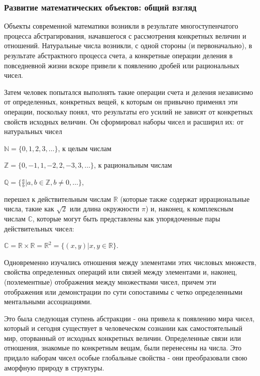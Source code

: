 \subsubsection{Развитие математических объектов: общий взгляд}
Объекты современной математики возникли в результате многоступенчатого процесса абстрагирования, начавшегося с рассмотрения конкретных величин и отношений. Натуральные числа возникли, с одной стороны (и первоначально), в результате абстрактного процесса счета, а конкретные операции деления в повседневной жизни вскоре привели к появлению дробей или рациональных чисел.

Затем человек попытался выполнять такие операции счета и деления независимо от определенных, конкретных вещей, к которым он привычно применял эти операции, поскольку понял, что результаты его усилий не зависят от конкретных свойств исходных величин.
Он сформировал наборы чисел и расширил их: от натуральных чисел

\vspace{0.5cm}
\(\mathbb{N}=\{0,1,2,3,\dots\}\), к целым числам

\(\mathbb{Z}=\{0,-1,1,-2,2,-3,3,\dots\}\), к рациональным числам

\(\mathbb{Q}=\{\frac{a}{b}|a,b \in \mathbb{Z}, b \neq 0 ,\dots\}\),

\vspace{0.5cm}

перешел к действительным числам \(\mathbb{R}\) (которые также содержат иррациональные числа, такие как \(\sqrt {2}\) или длина окружности \(\pi\)) и, наконец, к комплексным числам \(\mathbb{C}\), которые могут быть представлены как упорядоченные пары действительных чисел:

\vspace{0.5cm}
\(\mathbb{C}=\mathbb{R} \times \mathbb{R} = \mathbb{R}^{2} = \{(x,y) | x,y \in \mathbb{R}\}\).

\vspace{0.5cm}

Одновременно изучались отношения между элементами этих числовых множеств, свойства определенных операций или связей между элементами и, наконец, (поэлементные) отображения между множествами чисел, причем эти отображения или демонстрации по сути сопоставимы с четко определенными ментальными ассоциациями.

Это была следующая ступень абстракции - она привела к появлению мира чисел, который и сегодня существует в человеческом сознании как самостоятельный мир, оторванный от исходных конкретных величин. Определенные связи или отношения, знакомые по конкретным вещам, были перенесены на числа. Это придало наборам чисел особые глобальные свойства - они преобразовали свою аморфную природу в структуры.

